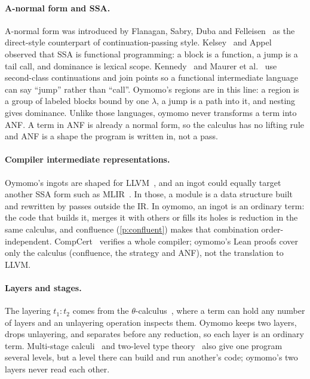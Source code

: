 \documentclass[11pt,letterpaper]{article}
\newcommand{\pref}[1]{\ref{#1}}  %
\begin{document}
\paragraph{A-normal form and SSA.}
A-normal form was introduced by Flanagan, Sabry, Duba and
Felleisen~\cite{flanagan1993} as the direct-style counterpart of
continuation-passing style. Kelsey~\cite{kelsey1995} and Appel~\cite{appel1998}
observed that SSA is functional programming: a block is a function, a jump is a
tail call, and dominance is lexical scope. Kennedy~\cite{kennedy2007} and Maurer
et al.~\cite{maurer2017} use second-class continuations and join points so a
functional intermediate language can say ``jump'' rather than ``call''.
Oymomo's regions are in this line: a region is a group of labeled blocks bound
by one $\lambda$, a jump is a path into it, and nesting gives dominance. Unlike
those languages, oymomo never transforms a term into ANF. A term in ANF is
already a normal form, so the calculus has no lifting rule and ANF is a shape
the program is written in, not a pass.

\paragraph{Compiler intermediate representations.}
Oymomo's ingots are shaped for LLVM~\cite{lattner2004}, and an ingot could
equally target another SSA form such as MLIR~\cite{lattner2021}. In those, a module is a data structure built and
rewritten by passes outside the IR. In oymomo, an ingot is an ordinary term: the
code that builds it, merges it with others or fills its holes is reduction in the
same calculus, and confluence (\pref{p:confluent}) makes that combination
order-independent. CompCert~\cite{leroy2009} verifies a whole compiler; oymomo's
Lean proofs cover only the calculus (confluence, the strategy and ANF), not the
translation to LLVM.

\paragraph{Layers and stages.}
The layering $t_1 : t_2$ comes from the $\theta$-calculus~\cite{bazar2026theta},
where a term can hold any number of layers and an unlayering operation inspects
them. Oymomo keeps two layers, drops unlayering, and separates before any
reduction, so each layer is an ordinary term. Multi-stage
calculi~\cite{davies2001} and two-level type theory~\cite{kovacs2022} also give
one program several levels, but a level there can build and run another's code;
oymomo's two layers never read each other.
\end{document}
